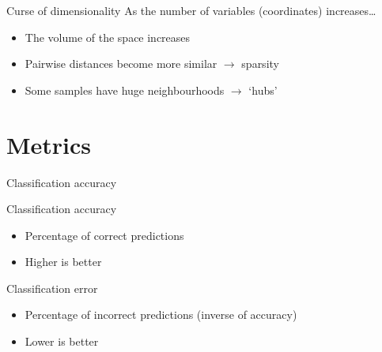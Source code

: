 \begin{frame}{Curse of dimensionality}
    As the number of variables (coordinates) increases\ldots
    \begin{itemize}
        \item The volume of the space increases
        \item Pairwise distances become more similar $\rightarrow$ sparsity
        \item Some samples have huge neighbourhoods $\rightarrow$ `hubs'
    \end{itemize}
\end{frame}

\section{Metrics}

\begin{frame}{Classification accuracy}
    \begin{block}{Classification accuracy}
        \begin{itemize}
            \item Percentage of \alert{correct} predictions
            \item Higher is better
        \end{itemize}
    \end{block}
    \vfill
    \begin{block}{Classification error}
        \begin{itemize}
            \item Percentage of \alert{incorrect} predictions
                  (inverse of accuracy)
            \item Lower is better
        \end{itemize}
    \end{block}
\end{frame}

\newsavebox{\TP}

\newsavebox{\TN}

